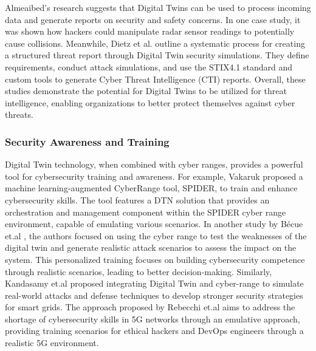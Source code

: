 Almeaibed's \cite{almeaibedDigitalTwinAnalysis2021} research suggests that Digital Twins can be used to process incoming data and generate reports on security and safety concerns. In one case study, it was shown how hackers could manipulate radar sensor readings to potentially cause collisions. Meanwhile, Dietz et al.\cite{dietzHarnessingDigitalTwin2022}  outline a systematic process for creating a structured threat report through Digital Twin security simulations. They define requirements, conduct attack simulations, and use the STIX4.1 standard and custom tools to generate Cyber Threat Intelligence (CTI) reports. Overall, these studies demonstrate the potential for Digital Twins to be utilized for threat intelligence, enabling organizations to better protect themselves against cyber threats.

\subsubsection{Security Awareness and Training}
Digital Twin technology, when combined with cyber ranges, provides a powerful tool for cybersecurity training and awareness. For example, Vakaruk \cite{vakarukDigitalTwinNetwork2021} proposed a machine learning-augmented CyberRange tool, SPIDER, to train and enhance cybersecurity skills. The tool features a DTN solution that provides an orchestration and management component within the SPIDER cyber range environment, capable of emulating various scenarios. In another  study by Bécue et.al \cite{becueCyberFactorySecuringIndustry40with2018}, the authors focused on using the cyber range to test the weaknesses of the digital twin and generate realistic attack scenarios to assess the impact on the system. This personalized training focuses on building cybersecurity competence through realistic scenarios, leading to better decision-making. Similarly, Kandasamy et.al \cite{kandasamyElectricPowerDigital2022} proposed integrating Digital Twin and cyber-range to simulate real-world attacks and defense techniques to develop stronger security strategies for smart grids. The approach proposed by Rebecchi et.al \cite{rebecchiDigitalTwin5G2022} aims to address the shortage of cybersecurity skills in 5G networks through an emulative approach, providing training scenarios for ethical hackers and DevOps engineers through a realistic 5G environment.







